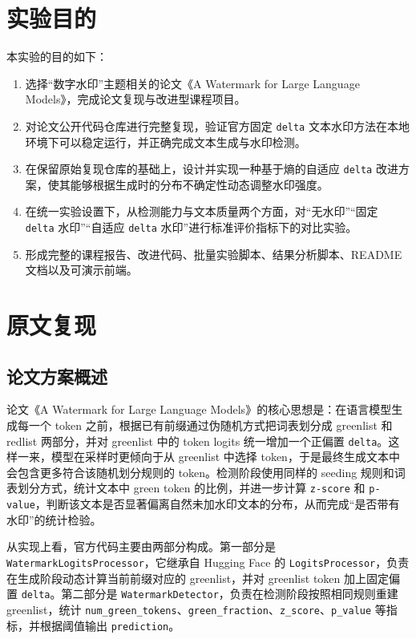 \documentclass{SYSUReport}
\begin{document}
\section{实验目的}

本实验的目的如下：

\begin{enumerate}
    \item 选择“数字水印”主题相关的论文《A Watermark for Large Language Models》，完成论文复现与改进型课程项目。
    \item 对论文公开代码仓库进行完整复现，验证官方固定 \texttt{delta} 文本水印方法在本地环境下可以稳定运行，并正确完成文本生成与水印检测。
    \item 在保留原始复现仓库的基础上，设计并实现一种基于熵的自适应 \texttt{delta} 改进方案，使其能够根据生成时的分布不确定性动态调整水印强度。
    \item 在统一实验设置下，从检测能力与文本质量两个方面，对“无水印”“固定 \texttt{delta} 水印”“自适应 \texttt{delta} 水印”进行标准评价指标下的对比实验。
    \item 形成完整的课程报告、改进代码、批量实验脚本、结果分析脚本、README 文档以及可演示前端。
\end{enumerate}

\section{原文复现}

\subsection{论文方案概述}

论文《A Watermark for Large Language Models》的核心思想是：在语言模型生成每一个 token 之前，根据已有前缀通过伪随机方式把词表划分成 greenlist 和 redlist 两部分，并对 greenlist 中的 token logits 统一增加一个正偏置 \texttt{delta}。这样一来，模型在采样时更倾向于从 greenlist 中选择 token，于是最终生成文本中会包含更多符合该随机划分规则的 token。检测阶段使用同样的 seeding 规则和词表划分方式，统计文本中 green token 的比例，并进一步计算 \texttt{z-score} 和 \texttt{p-value}，判断该文本是否显著偏离自然未加水印文本的分布，从而完成“是否带有水印”的统计检验。

从实现上看，官方代码主要由两部分构成。第一部分是 \texttt{WatermarkLogitsProcessor}，它继承自 Hugging Face 的 \texttt{LogitsProcessor}，负责在生成阶段动态计算当前前缀对应的 greenlist，并对 greenlist token 加上固定偏置 \texttt{delta}。第二部分是 \texttt{WatermarkDetector}，负责在检测阶段按照相同规则重建 greenlist，统计 \texttt{num\_green\_tokens}、\texttt{green\_fraction}、\texttt{z\_score}、\texttt{p\_value} 等指标，并根据阈值输出 \texttt{prediction}。
\end{document}
